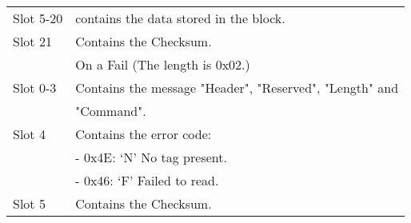 \begin{tabular}{|l|l|}
Slot 5-20 & contains the data stored in the block.\\
Slot 21 & Contains the Checksum.\\
\hline
&On a Fail (The length is 0x02.)\\
\hline
Slot 0-3 & Contains the message "Header", "Reserved", "Length" and\\
& "Command".\\
Slot 4 & Contains the error code:\\
& \indent - 0x4E: `N' No tag present.\\
& \indent - 0x46: `F' Failed to read.\\
Slot 5 & Contains the Checksum.\\
\hline
\end{tabular}